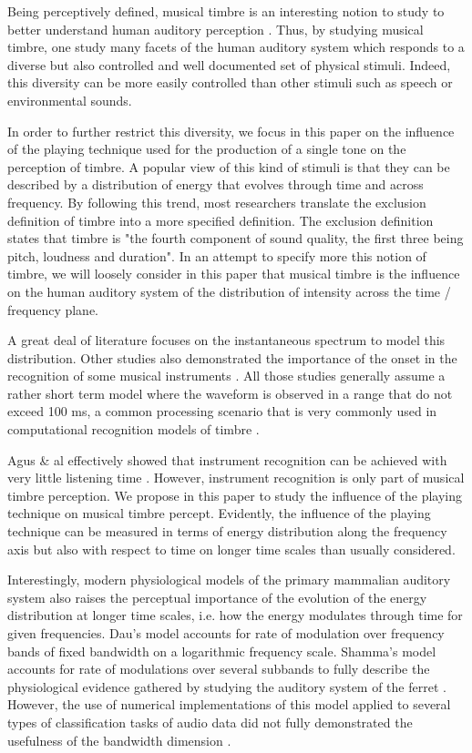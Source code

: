 \documentclass{article}
\makeatletter
\newcommand*{\ie}{i.e.\@\xspace}
\makeatother
\begin{document}
Being perceptively defined, musical timbre is an interesting notion to study to better understand human auditory perception \cite{grey1977multidimensional}.
Thus, by studying musical timbre, one study many facets of the human auditory system which responds to a diverse but also controlled and well documented set of physical stimuli.
Indeed, this diversity can be more easily controlled than other stimuli such as speech or environmental sounds.

In order to further restrict this diversity, we focus in this paper on the influence of the playing technique used for the production of a single tone on the perception of timbre.
A popular view of this kind of stimuli is that they can be described by a distribution of energy that evolves through time and across frequency.
By following this trend, most researchers translate the exclusion definition of timbre \cite{marozeau2003dependency} into a more specified definition.
The exclusion definition states that timbre is "the fourth component of sound quality, the first three being pitch, loudness and duration".
In an attempt to specify more this notion of timbre, we will loosely consider in this paper that musical timbre is the influence on the human auditory system of the distribution of intensity across the time / frequency plane.

A great deal of literature focuses on the instantaneous spectrum \cite{grey1978perceptual} to model this distribution.
Other studies also demonstrated the importance of the onset in the recognition of some musical instruments \cite{eronen2001comparison}.
All those studies generally assume a rather short term model where the waveform is observed in a range that do not exceed 100 ms, a common processing scenario that is very commonly used in computational recognition models of timbre \cite{tzanetakis2002musical}.

Agus \& al effectively showed that instrument recognition can be achieved with very little listening time \cite{agus2012fast}.
However, instrument recognition is only part of musical timbre perception. We propose in this paper to study the influence of the playing technique on musical timbre percept.
Evidently, the influence of the playing technique can be measured in terms of energy distribution along the frequency axis but also with respect to time on longer time scales than usually considered.

Interestingly, modern physiological models of the primary mammalian auditory system also raises the perceptual importance of the evolution of the energy distribution at longer time scales, \ie{} how the energy modulates through time for given frequencies. 
Dau's model accounts for  rate of modulation over frequency bands of fixed bandwidth on a logarithmic frequency scale\cite{dau1997modeling}. Shamma's model accounts for rate of modulations over several subbands to fully describe the physiological evidence gathered by studying the auditory system of the ferret \cite{yang1992auditory}.
However, the use of numerical implementations of this model applied to several types of classification tasks of audio data did not fully demonstrated the usefulness of the bandwidth dimension \cite{mesgarani2006discrimination}.
\end{document}
